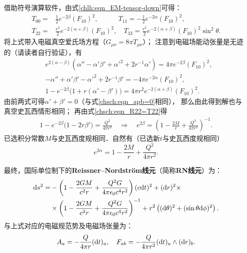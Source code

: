 借助符号演算软件，由式\eqref{chlh:eqn_EM-tensor-down}可得：
\begin{equation}
\begin{aligned}
    T_{00}=& \frac{1}{2} e^{-2 \beta } (F_{10})^2,\qquad\quad
    T_{11}= -\frac{1}{2} e^{-2 \alpha }(F_{10})^2, \\
    T_{22}=& \frac{r^2}{2} e^{-2 (\alpha +\beta )}  (F_{10})^2,\quad
    T_{33}= \frac{r^2}{2} e^{-2 (\alpha +\beta )}  (F_{10})^2 \sin ^2\theta   .
\end{aligned}
\end{equation}
将上式带入电磁真空爱氏场方程（$G_{\mu\nu}=8\pi T_{\mu\nu}$）；
注意到电磁场能动张量是无迹的（请读者自行验证），有
\begin{align}
    &  e^{2(\alpha-\beta)} ( \alpha'' - \alpha'\beta'
    +\alpha'^2 +2 r^{-1} \alpha' ) = 4\pi e^{-2 \beta } (F_{10})^2, \\
    & - \alpha'' + \alpha'\beta' -\alpha'^2  +2 r^{-1} \beta'  
    =-4\pi  e^{-2 \alpha }(F_{10})^2, \\
    & 1 - e^{-2\beta} \bigl(1+ r(\alpha'-\beta')\bigr)
    =4\pi r^2 e^{-2 (\alpha +\beta )}  (F_{10})^2  \label{chsch:eqn_R22=T22}.
\end{align}
由前两式可得$\alpha'+\beta'=0$（与式\eqref{chsch:eqn_apb=0}相同），
那么由此得到解也与真空史瓦西情形相同；
再由式\eqref{chsch:eqn_R22=T22}得
\begin{align}
1 - e^{-2\beta} \bigl(1- 2r\beta'\bigr)= \frac{Q^2}{4\pi r^2} 
\quad \Rightarrow \quad
e^{2\beta}  = \left(1-\frac{2M}{r}+\frac{Q^2 }{4\pi r^2}\right)^{-1} .
\end{align}
已选积分常数$M$与史瓦西度规相同．自然有（已选新$t$与史瓦西度规相同）
\begin{equation}
    e^{2\alpha} =1-\frac{2 M}{ r}+ \frac{Q^2 }{4\pi r^2} .
\end{equation}



最终，国际单位制下的{\bfseries\heiti Reissner--Nordstr\"om线元}（简称{\bfseries\heiti RN线元}）为：
\begin{equation}\label{chsch:eqn_RN-metric}
\begin{aligned}
    {\rm d}s^2 =& - \left(1-\frac{2G M}{c^2 r}+ \frac{Q^2 G }{4\pi \epsilon_0 c^4 r^2} \right) (c{\rm d}t)^2
    + ({\rm d}r)^2 \times \\
    &\times \left(1-\frac{2G M}{c^2 r}+\frac{Q^2 G }{4\pi \epsilon_0 c^4 r^2}\right)^{-1}  
    + r^2 \left(({\rm d}\theta)^2 + (\sin\theta {\rm d}\phi)^2\right).
\end{aligned}    
\end{equation}
与上式对应的电磁规范势及电磁场张量为：
\begin{equation}\label{chsch:eqn_SRN-EMA}
	A_a= -\frac{Q }{4 \pi r  } ({\rm d}t)_a,\quad
	F_{ab}=-\frac{Q}{4\pi r^2} ({\rm d}t)_a \wedge ({\rm d} r)_b .
\end{equation}


